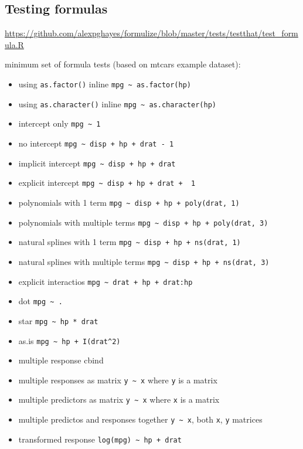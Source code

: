 \documentclass[]{book}
\providecommand{\tightlist}{%
  \setlength{\itemsep}{0pt}\setlength{\parskip}{0pt}}
\theoremstyle{definition}
\theoremstyle{definition}
\theoremstyle{definition}
\theoremstyle{remark}
\begin{document}
\subsection{Testing formulas}\label{testing-formulas}

\url{https://github.com/alexpghayes/formulize/blob/master/tests/testthat/test_formula.R}

minimum set of formula tests (based on mtcars example dataset):

\begin{itemize}
\tightlist
\item
  using \texttt{as.factor()} inline
  \texttt{mpg\ \textasciitilde{}\ as.factor(hp)}
\item
  using \texttt{as.character()} inline
  \texttt{mpg\ \textasciitilde{}\ as.character(hp)}
\item
  intercept only \texttt{mpg\ \textasciitilde{}\ 1}
\item
  no intercept
  \texttt{mpg\ \textasciitilde{}\ disp\ +\ hp\ +\ drat\ -\ 1}
\item
  implicit intercept
  \texttt{mpg\ \textasciitilde{}\ disp\ +\ hp\ +\ drat}
\item
  explicit intercept
  \texttt{mpg\ \textasciitilde{}\ disp\ +\ hp\ +\ drat\ +\ \ 1}
\item
  polynomials with 1 term
  \texttt{mpg\ \textasciitilde{}\ disp\ +\ hp\ +\ poly(drat,\ 1)}
\item
  polynomials with multiple terms
  \texttt{mpg\ \textasciitilde{}\ disp\ +\ hp\ +\ poly(drat,\ 3)}
\item
  natural splines with 1 term
  \texttt{mpg\ \textasciitilde{}\ disp\ +\ hp\ +\ ns(drat,\ 1)}
\item
  natural splines with multiple terms
  \texttt{mpg\ \textasciitilde{}\ disp\ +\ hp\ +\ ns(drat,\ 3)}
\item
  explicit interactios
  \texttt{mpg\ \textasciitilde{}\ drat\ +\ hp\ +\ drat:hp}
\item
  dot \texttt{mpg\ \textasciitilde{}\ .}
\item
  star \texttt{mpg\ \textasciitilde{}\ hp\ *\ drat}
\item
  as.is \texttt{mpg\ \textasciitilde{}\ hp\ +\ I(drat\^{}2)}
\item
  multiple response cbind
\item
  multiple responses as matrix \texttt{y\ \textasciitilde{}\ x} where
  \texttt{y} is a matrix
\item
  multiple predictors as matrix \texttt{y\ \textasciitilde{}\ x} where
  \texttt{x} is a matrix
\item
  multiple predictos and responses together
  \texttt{y\ \textasciitilde{}\ x}, both \texttt{x}, \texttt{y} matrices
\item
  transformed response \texttt{log(mpg)\ \textasciitilde{}\ hp\ +\ drat}
\end{itemize}
\end{document}
